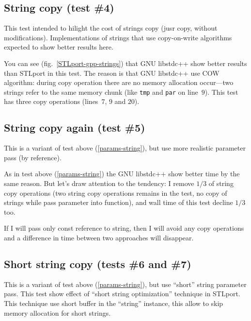 \documentclass[a4paper]{article}
\providecommand{\STLport}{{\fontfamily{cmss}\selectfont STLport}}
\providecommand{\libstd}{{\fontfamily{cmtt}\selectfont GNU \mbox{libstdc++}}}
\begin{document}
\subsection{String copy\label{params-string} (test \#4)}

This test intended to hilight the cost of strings copy (jusr copy, without modifications).
Implementations of strings that use copy-on-write algorithms
expected to show better results here.




You can see (fig.~\ref{STLport-gpp-strings}) that \libstd{} show better
results than \STLport{} in this test. The reason is that \libstd{}
use COW algorithm: during copy operation
there are no memory allocation occur---two strings refer to the same
memory chunk (like \verb|tmp| and \verb|par| on line~$9$). This test
has three copy operations (lines~$7$, $9$ and $20$).

\subsection{String copy again\label{params-ref-string} (test \#5)}

This is a variant of test above (\ref{params-string}), but use more realistic
parameter pass (by reference).



As in test above (\ref{params-string}) the \libstd{} show better time
by the same reason. But let's draw attention to the tendency: I remove
$1/3$ of string copy operations (two string copy operations remains in the test, no copy of strings while pass
parameter into function), and wall time of this test decline $1/3$ too.

If I will pass only const reference to string, then I will avoid any copy
operations and a difference in time between two approaches will disappear.

\subsection{Short string copy\label{params-short-string} (tests \#6 and \#7)}

This is a variant of test above (\ref{params-string}), but use ``short'' string
parameter pass. This test show effect of ``short string optimization'' technique
in \STLport{}. This technique use short buffer in the ``string'' instance,
this allow to skip memory allocation for short strings.
\end{document}
